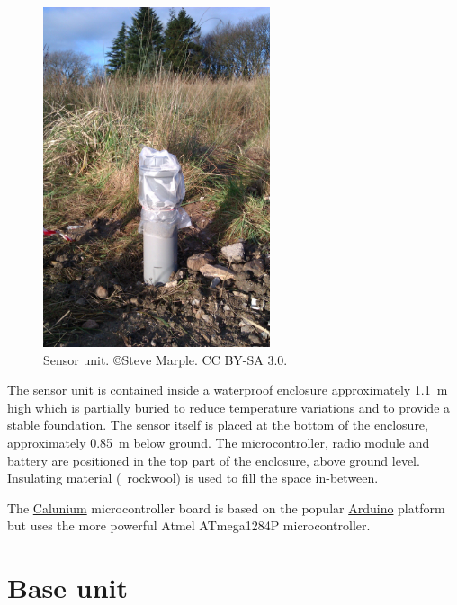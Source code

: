 \begin{figure}
  \centering
  \includegraphics[keepaspectratio,height=10cm]{images/sensor-unit}
  \caption[Sensor unit]%
  {Sensor unit. \small{\copyright Steve Marple. CC BY-SA 3.0.}}
  \label{fig:sensor-unit}
\end{figure}

The sensor unit is contained inside a waterproof enclosure
approximately \SI{1.1}{\metre} high which is partially buried to reduce
temperature variations and to provide a stable foundation. The sensor
itself is placed at the bottom of the enclosure, approximately
\SI{0.85}{\metre} below ground. The microcontroller, radio module and
battery are positioned in the top part of the enclosure, above ground
level. Insulating material (\eg\ rockwool) is used to fill the space
in-between.

The
\href{http://blog.stevemarple.co.uk/search/label/Calunium}{Calunium}
microcontroller board is based on the popular
\href{http://arduino.cc}{Arduino} platform but uses the more powerful
Atmel ATmega1284P microcontroller.

\section{Base unit}

